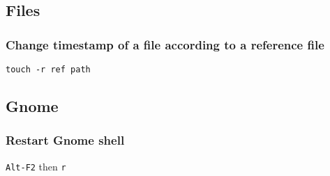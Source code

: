 \subsection{Files}
\subsubsection{Change timestamp of a file according to a reference file}
\verb|touch -r ref path|

\subsection{Gnome}
\subsubsection{Restart Gnome shell}
\verb|Alt-F2| then \verb|r|
